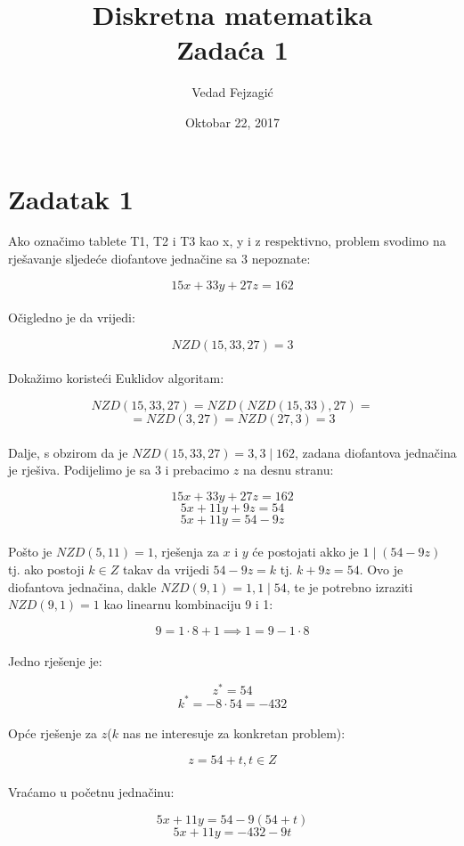 \documentclass[12pt]{article}
\title{
  Diskretna matematika\\
  \large Zadaća 1 \\}
\author{Vedad Fejzagić}
\date{Oktobar 22, 2017}
\begin{document}
\maketitle

\newpage

\section*{Zadatak 1\label{Z1}}

\hspace{0.65cm}Ako označimo tablete T1, T2 i T3 kao x, y i z respektivno, problem svodimo na rješavanje sljedeće diofantove jednačine sa 3 nepoznate:

$$15x + 33y + 27z = 162$$\\

Očigledno je da vrijedi:

$$NZD(15, 33, 27) = 3$$\\

Dokažimo koristeći Euklidov algoritam:

$$NZD(15, 33, 27) = NZD(NZD(15, 33), 27) =$$ 
$$= NZD(3, 27) = NZD(27, 3) = 3$$\\

Dalje, s obzirom da je $NZD(15, 33, 27) = 3, 3 \mid 162$, zadana diofantova jednačina je rješiva. Podijelimo je sa $3$ i prebacimo $z$ na desnu stranu:

$$15x + 33y + 27z = 162$$
$$5x + 11y + 9z = 54$$
$$5x + 11y = 54 - 9z$$\\

Pošto je $NZD(5, 11) = 1$, rješenja za $x$ i $y$ će postojati akko je $1 \mid (54 - 9z)$ tj. ako postoji $k\in Z$ takav da vrijedi $54 - 9z = k$ tj. $k + 9z = 54$. Ovo je diofantova jednačina, dakle $NZD(9, 1) = 1, 1 \mid 54$, te je potrebno izraziti $NZD(9, 1) = 1$ kao linearnu kombinaciju 9 i 1:

$$9 = 1 \cdot 8 + 1 \implies 1 = 9 - 1 \cdot 8$$\\

Jedno rješenje je:

$$z^{*} = 54$$
$$k^{*} = - 8 \cdot 54 = - 432$$\\

Opće rješenje za $z$($k$ nas ne interesuje za konkretan problem):

$$z = 54 + t, t\in Z$$\\

Vraćamo u početnu jednačinu:

$$5x + 11y = 54 - 9(54 + t)$$
$$5x + 11y = -432 - 9t$$\\
\end{document}
